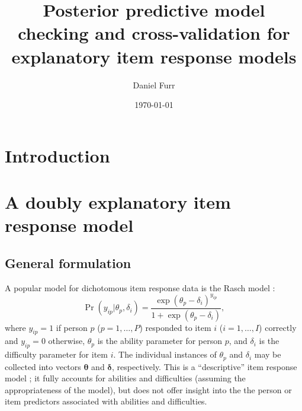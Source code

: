 \documentclass[12pt, letterpaper]{article}
\title{Posterior predictive model checking and cross-validation for explanatory item response models}
\author{Daniel Furr}
\date{\today}
\begin{document}


\newcommand{\y}        {\mathbf{y}}
\newcommand{\yip}      {{y_{ip}}}
\newcommand{\x}        {\mathbf{x}_i}
\newcommand{\X}        {\mathbf{X}}
\newcommand{\w}        {\mathbf{w}_p}
\newcommand{\W}        {\mathbf{W}}
\newcommand{\D}        {\mathbf{D}}
\newcommand{\N}[1]     {\mathrm{N}(#1)}
\newcommand{\vbeta}    {\boldsymbol{\beta}}
\newcommand{\vgamma}   {\boldsymbol{\gamma}}
\newcommand{\vomega}   {\boldsymbol{\omega}}
\newcommand{\vzeta}    {\boldsymbol{\zeta}}
\newcommand{\vepsilon} {\boldsymbol{\epsilon}}
\newcommand{\vdelta}   {\boldsymbol{\delta}}
\newcommand{\vtheta}   {\boldsymbol{\theta}}

\newcommand{\comment}[1]{{\footnotesize[\textit{#1}]}}

\maketitle

\tableofcontents
\newpage
{\footnotesize }

\section{Introduction}

\section{A doubly explanatory item response model}

\subsection{General formulation}

A popular model for dichotomous item response data is the Rasch model \cite{Rasch1960a}:
\begin{equation} \label{eq:base}
	\Pr ( \yip | \theta_p, \delta_i) =
	\frac {\exp(\theta_p - \delta_i)^\yip}
	{1 + \exp(\theta_p - \delta_i)}
,\end{equation}
where $y_{ip} = 1$ if person $p$ ($p = 1, \dotsc, P$) responded to item $i$ ($i = 1, \dotsc, I$) correctly and $y_{ip} = 0$ otherwise, $\theta_p$ is the ability parameter for person $p$, and $\delta_i$ is the difficulty parameter for item $i$. The individual instances of $\theta_p$ and $\delta_i$ may be collected into vectors $\vtheta$ and $\vdelta$, respectively. This is a ``descriptive'' item response model \cite{Wilson2004}; it fully accounts for abilities and difficulties (assuming the appropriateness of the model), but does not offer insight into the the person or item predictors associated with abilities and difficulties.
\end{document}
